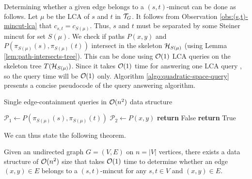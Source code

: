 
Determining whether a given edge belongs to a $(s,t)$-mincut can be done as follows. Let $\mu$ be the LCA of $s$ and $t$ in ${\cal T}_G$. It follows from Observation \ref{obs:(s,t)-mincut-lca} that $c_{s,t}=c_{S(\mu)}$. Thus, $s$ and $t$ must be separated by some Steiner mincut for set $S(\mu)$. We check if paths $P(x,y)$ and $P(\pi_{S(\mu)}(s),\pi_{S(\mu)}(t))$ intersect in the skeleton ${\cal H}_{S(\mu)}$ (using Lemma \ref{lem:path-intersects-tree}). This can be done using ${\cal O}(1)$ LCA queries on the skeleton tree $T({\cal H}_{S(\mu)})$. Since it takes ${\cal O}(1)$ time for answering one LCA query \cite{DBLP:journals/jal/BenderFPSS05}, so the query time will be ${\cal O}(1)$ only. Algorithm \ref{algo:quadratic-space-query} presents a concise pseudocode of the query answering algorithm.

\begin{algorithm}%
    \caption{Single edge-containment queries in ${\cal O}(n^2)$ data structure}
    \label{algo:quadratic-space-query}
    \begin{algorithmic}[1] %
            \State $\mathcal P_1 \gets P(\pi_{S(\mu)}(s),\pi_{S(\mu)}(t))$
            \State $\mathcal P_2 \gets P(x,y)$
            \State \textbf{return} False
            \Else 
            \State \textbf{ return} True
            \EndIf
        \EndProcedure
    \end{algorithmic}
\end{algorithm}
We can thus state the following theorem.
\begin{theorem}
 Given an undirected graph $G=(V,E)$ on $n=|V|$ vertices, there exists a data structure of 
${\cal O}(n^2)$ size that takes ${\cal O}(1)$ time to determine whether an edge $(x,y)\in E$
belongs to a $(s,t)$-mincut for any $s,t\in V$
and $(x,y)\in E$.
\end{theorem}

